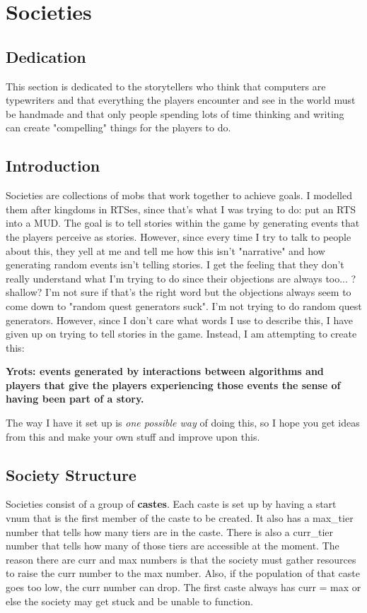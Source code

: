 
\chapter{Societies}

\section{Dedication}

This section is dedicated to the storytellers who think that computers
are typewriters and that everything the players encounter and see in the
world must be handmade and that only people spending lots of time
thinking and writing  can create "compelling" things for the players to do.

\section{Introduction}

Societies are collections of mobs that work together to achieve
goals. I modelled them after kingdoms in RTSes, since that's what I
was trying to do: put an RTS into a MUD. The goal is to tell stories 
within the game by generating events that the players perceive as
stories. However, since every time I try to talk to people about
this, they yell at me and tell me how this isn't "narrative"
and how generating random events isn't telling stories. I get the
feeling that they don't really understand what I'm trying to do
since their objections are always too... ?shallow? I'm not sure if that's
the right word but the objections always seem to come down to "random
quest generators suck". I'm not trying to do random quest generators.
However, since I don't care what words I use to describe this,  I have 
given up on trying to tell stories in the game. Instead, I am attempting 
to create this:

{\bf{Yrots: events generated by interactions between algorithms and players 
that give the players experiencing those events the sense of having
been part of a story.}}

The way I have it set up is {\it{one possible way}} of doing this, so
I hope you get ideas from this and make your own stuff and improve
upon this.

\section{Society Structure}

Societies consist of a group of {\bf{castes}}. Each caste is set up by having
a start vnum that is the first member of the caste to be created. It also has
a max\_tier number that tells how many tiers are in the caste. There is also
a curr\_tier number that tells how many of those tiers are accessible at the
moment. The reason there are curr and max numbers is that the society must
gather resources to raise the curr number to the max number. Also, if the
population of that caste goes too low, the curr number can drop. The
first caste always has curr = max or else the society may get stuck
and be unable to function.

